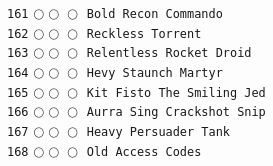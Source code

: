 \documentclass[a4paper,landscape]{article}
\begin{document}
\begin{multicols*}{5}
\texttt{161} \(\bigcirc\!\bigcirc\!\bigcirc\)  \texttt{Bold Recon Commando} \vspace{-0.3mm}\\ 
\texttt{162} \(\bigcirc\!\bigcirc\!\bigcirc\)  \texttt{Reckless Torrent} \vspace{-0.3mm}\\ 
\texttt{163} \(\bigcirc\!\bigcirc\!\bigcirc\)  \texttt{Relentless Rocket Droid} \vspace{-0.3mm}\\ 
\texttt{164} \(\bigcirc\!\bigcirc\!\bigcirc\)  \texttt{Hevy Staunch Martyr} \vspace{-0.3mm}\\ 
\texttt{165} \(\bigcirc\!\bigcirc\!\bigcirc\)  \texttt{Kit Fisto The Smiling Jed} \vspace{-0.3mm}\\ 
\texttt{166} \(\bigcirc\!\bigcirc\!\bigcirc\)  \texttt{Aurra Sing Crackshot Snip} \vspace{-0.3mm}\\ 
\texttt{167} \(\bigcirc\!\bigcirc\!\bigcirc\)  \texttt{Heavy Persuader Tank} \vspace{-0.3mm}\\ 
\texttt{168} \(\bigcirc\!\bigcirc\!\bigcirc\)  \texttt{Old Access Codes} \vspace{-0.3mm}\\ 

\end{multicols*}
\end{document}
